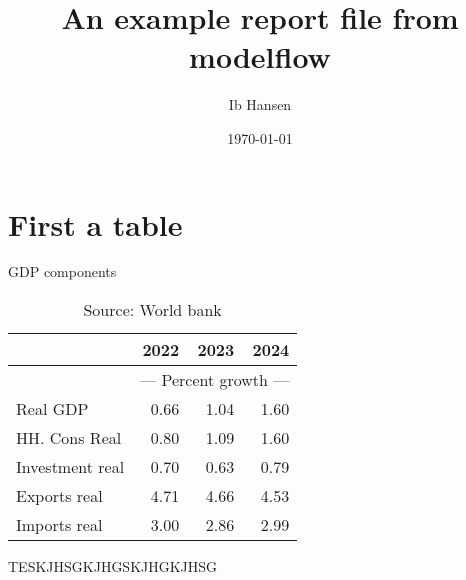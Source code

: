 \documentclass{article}
\begin{document}
\title{An example report file from modelflow }
\author{Ib Hansen}
\date{\today} 

\maketitle
\tableofcontents
\newpage
\section{First a table}

\begin{table}[ht]
\caption*{GDP components}
\begin{tabular}{lrrr}
\toprule
 & 2022 & 2023 & 2024 \\
\midrule
&\multicolumn{3}{c}{{--- Percent growth ---}}                \\
Real GDP & 0.66 & 1.04 & 1.60 \\
HH. Cons Real & 0.80 & 1.09 & 1.60 \\
Investment real & 0.70 & 0.63 & 0.79 \\
Exports real & 4.71 & 4.66 & 4.53 \\
Imports real & 3.00 & 2.86 & 2.99 \\
\bottomrule
\end{tabular}
\caption*{Source: World bank }
\end{table}
TESKJHSGKJHGSKJHGKJHSG
\end{document}
